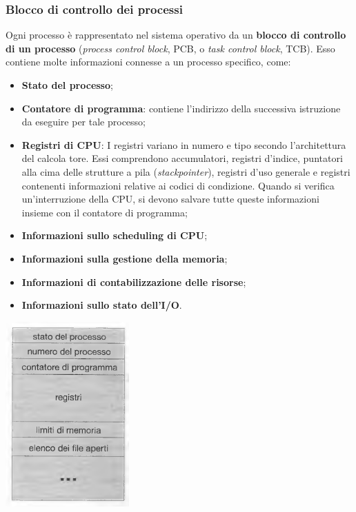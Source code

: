 \documentclass[11pt,a4paper]{article}
\begin{document}
\subsubsection{Blocco di controllo dei processi}
Ogni processo è rappresentato nel sistema operativo da un \textbf{blocco di controllo di un pro­cesso} (\emph{process control block}, PCB, o \emph{task control block}, TCB). Esso contiene molte informazioni connesse a un processo specifico, come:
\begin{itemize}[leftmargin=*, noitemsep]
  \item \textbf{Stato del processo};
  \item \textbf{Contatore di programma}: contiene l'indirizzo della suc­cessiva istruzione da eseguire per tale processo;
  \item \textbf{Registri di CPU}: I registri variano in numero e tipo secondo l'architettura del calcola­
  tore. Essi comprendono accumulatori, registri d'indice, puntatori alla cima delle strut­ture a pila (\emph{stackpointer}), registri d'uso generale e registri contenenti informazioni re­lative ai codici di condizione. Quando si verifica un'interruzione della CPU, si devono
  salvare tutte queste informazioni insieme con il contatore di programma;
  \item \textbf{Informazioni sullo scheduling di CPU};
  \item \textbf{Informazioni sulla gestione della memoria};
  \item \textbf{Informazioni di contabilizzazione delle risorse};
  \item \textbf{Informazioni sullo stato dell'I/O}.
\end{itemize}


\begin{center}
  \includegraphics[scale=0.7]{img/0006.png}
\end{center}
\end{document}
